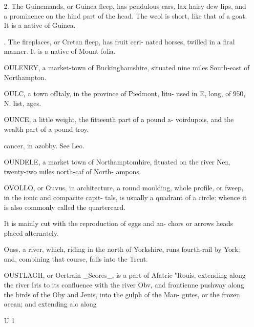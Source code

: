 2. The Guinemands, or Guinea fleep, has pendulous ears, lax hairy dew lips, and a prominence on the hind part of the head. The weol is short, like that of a goat. It is a native of Guinea.\par{}. The fireplaces, or Cretan fleep, has fruit ceri- nated horses, twilled in a firal manner. It is a native of Mount folia.\par\medskip
OULENEY, a market-town of Buckinghamshire, situated nine miles South-east of Northampton.\par\medskip
OULC, a town ofItaly, in the province of Piedmont, litu- used in E, long, of 950, N. list, ages.\par\medskip
OUNCE, a little weight, the fitteenth part of a pound a- voirdupois, and the wealth part of a pound troy.\par\medskip
cancer, in azobby. See Leo.\par\medskip
OUNDELE, a market town of Northamptomhire, fituated on the river Nen, twenty-two miles north-caf of North- ampons.\par\medskip
OVOLLO, or Ouvus, in architecture, a round moulding, whole profile, or fweep, in the ionic and compacite capit- tals, is usually a quadrant of a circle; whence it is also commonly called the quartercard.\par\medskip
It is mainly cut with the reproduction of eggs and an- chors or arrows heads placed alternately.\par\medskip
Ouss, a river, which, riding in the north of Yorkshire, runs fourth-rail by York; and, combining that course, falls into the Trent.\par\medskip
OUSTLAGH, or Oertrain \_Scores\_, is a part of Afatrie "Rouis, extending along the river Iris to its confluence with the river Obv, and frontienne pushway along the birds of the Oby and Jenis, into the gulph of the Man- gutes, or the frozen ocean; and extending alo along\par{} U 1\par\medskip
